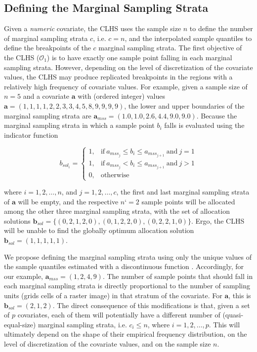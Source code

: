 \subsection{Defining the Marginal Sampling Strata}

Given a \emph{numeric} covariate, the CLHS uses the sample size $n$ to define the number of marginal 
sampling strata $c$, i.e. $c = n$, and the interpolated sample quantiles to define the breakpoints of the 
$c$ marginal sampling strata. The first objective of the CLHS ($\mathcal{O}_1$) is to have exactly one 
sample point falling in each marginal sampling strata. However, depending on the level of discretization of 
the covariate values, the CLHS may produce replicated breakpoints in the regions with a relatively high 
frequency of covariate values. For example, given a sample size of $n = 5$ and a covariate $\boldsymbol{a}$ 
with (ordered integer) values $\boldsymbol{a} = (1, 1, 1, 1, 2, 2, 3, 3, 4, 5, 8, 9, 9, 9, 9)$, the lower and 
upper boundaries of the marginal sampling strata are $\boldsymbol{a}_{mss} = (1.0, 1.0, 2.6, 4.4, 9.0, 9.0)$. 
Because the marginal sampling strata in which a sample point $b_i$ falls is evaluated using the indicator 
function

\begin{equation*}
 b_{sol_i} = 
 \begin{cases}
  1, & \text{if}\ a_{mss_j} \leq b_i \leq a_{mss_{j + 1}}\ \text{and}\ j = 1 \\ 
  1, & \text{if}\ a_{mss_j} < b_i \leq a_{mss_{j + 1}}\ \text{and}\ j > 1 \\ 
  0, & \text{otherwise}
 \end{cases}
\end{equation*}

\noindent where $i = 1, 2, \ldots, n$, and $j = 1, 2, \ldots, c$, the first and last marginal sampling strata 
of $\boldsymbol{a}$ will be empty, and the respective $n‘ = 2$ sample points will be allocated among the other 
three marginal sampling strata, with the set of allocation solutions $\boldsymbol{b}_{sol} = \{(0, 2, 1, 2, 
0), (0, 1, 2, 2, 0), (0, 2, 2, 1, 0)\}$. Ergo, the CLHS will be unable to find the globally optimum allocation 
solution $\boldsymbol{b}_{sol} = (1, 1, 1, 1, 1)$.

We propose defining the marginal sampling strata using only the unique values of the sample quantiles 
estimated with a discontinuous function \cite{HyndmanEtAl1996}. Accordingly, for our example, 
$\boldsymbol{a}_{mss} = (1, 2, 4, 9)$. The number of sample points that should fall in each marginal sampling 
strata is directly proportional to the number of sampling units (grids cells of a raster image) in that 
stratum of the covariate. For $\boldsymbol{a}$, this is $\boldsymbol{b}_{sol} = (2, 1, 2)$. The direct 
consequence of this modifications is that, given a set of $p$ covariates, each of them will potentially have a 
different number of (quasi-equal-size) marginal sampling strata, i.e. $c_i \leq n$, where $i = 1, 2, \ldots, 
p$. This will ultimately depend on the shape of their empirical frequency distribution, on the level of 
discretization of the covariate values, and on the sample size $n$.

